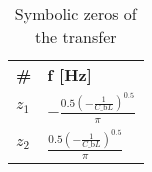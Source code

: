 \begin{table}[H]
\centering
\begin{tabular}[c]{ll}
\textbf{\#} & \textbf{f [Hz]} \\ 
\rowcolor{myyellow}
$z_{\mathrm{1}}$ &\small{$- \frac{0.5 \left(- \frac{1}{C\_{\mathrm{b}} L}\right)^{0.5}}{\pi}$} \\ 
$z_{\mathrm{2}}$ &\small{$\frac{0.5 \left(- \frac{1}{C\_{\mathrm{b}} L}\right)^{0.5}}{\pi}$} \\ 
\end{tabular}
\caption{Symbolic zeros of the transfer}
\label{tab-symzeros}
\end{table}

